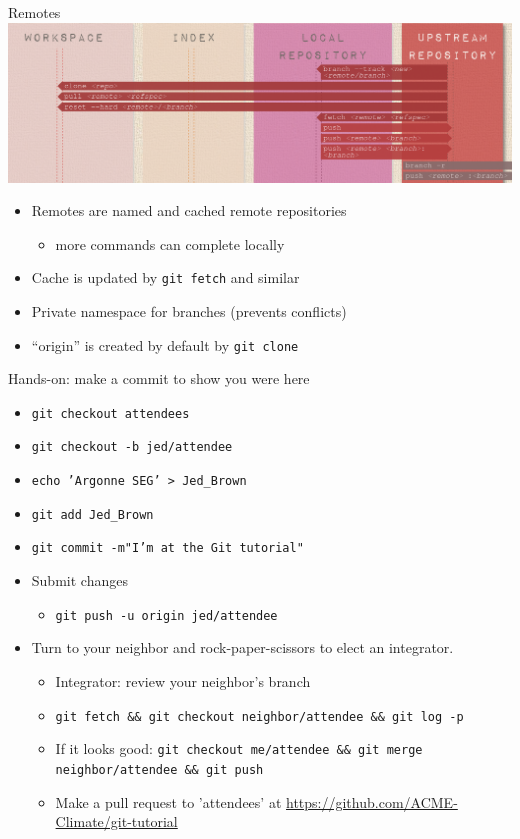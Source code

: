 \documentclass{beamer}
\begin{document}
\begin{frame}{Remotes}
  \includegraphics[width=\textwidth]{figures/Git/remote-repo.png} \\
  \begin{itemize}
  \item Remotes are named and cached remote repositories
    \begin{itemize}
    \item more commands can complete locally
    \end{itemize}
  \item Cache is updated by \texttt{git fetch} and similar
  \item Private namespace for branches (prevents conflicts)
  \item ``origin'' is created by default by \texttt{git clone}
  \end{itemize}
\end{frame}

\begin{frame}{Hands-on: make a commit to show you were here}
  \begin{itemize}
  \item \texttt{git checkout attendees}
  \item \texttt{git checkout -b jed/attendee}
  \item \texttt{echo 'Argonne  SEG' > Jed\_Brown}
  \item \texttt{git add Jed\_Brown}
  \item \texttt{git commit -m"I'm at the Git tutorial"}
  \item Submit changes
    \begin{itemize}
    \item \texttt{git push -u origin jed/attendee} \\
    \end{itemize}
  \item Turn to your neighbor and rock-paper-scissors to elect an integrator.
    \begin{itemize}
    \item Integrator: review your neighbor's branch
    \item \texttt{git fetch \&\& git checkout neighbor/attendee \&\& git log -p}
    \item If it looks good: \texttt{git checkout me/attendee \&\& git merge neighbor/attendee \&\& git push}
    \item Make a pull request to 'attendees' at \url{https://github.com/ACME-Climate/git-tutorial}
    \end{itemize}
  \end{itemize}
\end{frame}
\end{document}
